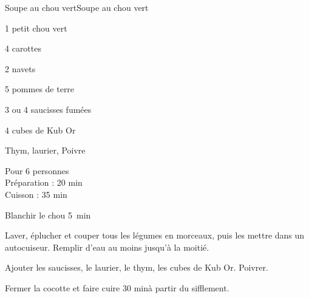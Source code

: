 \begin{recette}{Soupe au chou vert}{Soupe au chou vert}

\begin{ingredients}
1 petit chou vert\par
4 carottes\par
2 navets\par
5 pommes de terre\par
3 ou 4 saucisses fumées\par
4 cubes de Kub Or\par
Thym, laurier, Poivre\par
\end{ingredients}

\begin{infos}
Pour 6 personnes\\
Préparation : 20 min\\
Cuisson : 35 min\\
\end{infos}

\begin{etapes}
\item Blanchir le chou 5~min
\item Laver, éplucher et couper tous les légumes en morceaux, puis les mettre dans un autocuiseur. Remplir d'eau au moins jusqu'à la moitié.
\item Ajouter les saucisses, le laurier, le thym, les cubes de Kub Or. Poivrer.
\item Fermer la cocotte et faire cuire 30 minà partir du sifflement.
\end{etapes}

\end{recette}